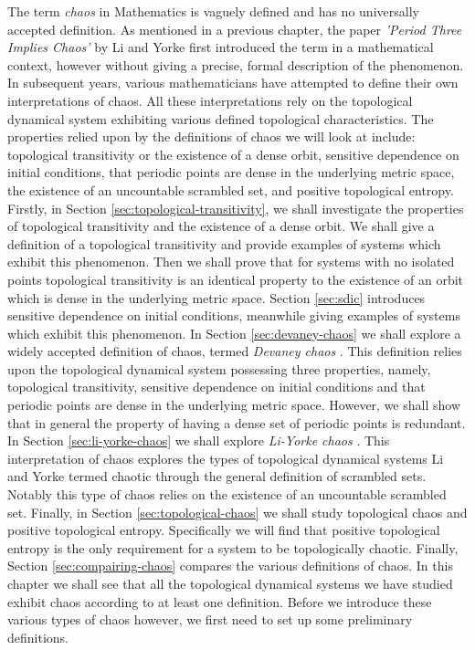 The term \emph{chaos} in Mathematics is vaguely defined and has no universally accepted definition. As mentioned in a previous chapter, the paper \emph{'Period Three Implies Chaos'} by Li and Yorke \cite{li-yorke} first introduced the term in a mathematical context, however without giving a precise, formal description of the phenomenon. In subsequent years, various mathematicians have attempted to define their own interpretations of chaos. All these interpretations rely on the topological dynamical system exhibiting various defined topological characteristics. The properties relied upon by the definitions of chaos we will look at include: topological transitivity or the existence of a dense orbit, sensitive dependence on initial conditions, that periodic points are dense in the underlying metric space, the existence of an uncountable scrambled set, and positive topological entropy. Firstly, in Section \ref{sec:topological-transitivity}, we shall investigate the properties of topological transitivity and the existence of a dense orbit. We shall give a definition of a topological transitivity and provide examples of systems which exhibit this phenomenon. Then we shall prove that for systems with no isolated points topological transitivity is an identical property to the existence of an orbit which is dense in the underlying metric space. Section \ref{sec:sdic} introduces sensitive dependence on initial conditions, meanwhile giving examples of systems which exhibit this phenomenon. In Section \ref{sec:devaney-chaos} we shall explore a widely accepted definition of chaos, termed \emph{Devaney chaos} \cite{devaney}. This definition relies upon the topological dynamical system possessing three properties, namely, topological transitivity, sensitive dependence on initial conditions and that periodic points are dense in the underlying metric space. However, we shall show that in general the property of having a dense set of periodic points is redundant. In Section \ref{sec:li-yorke-chaos} we shall explore \emph{Li-Yorke chaos} \cite{li-yorke}. This interpretation of chaos explores the types of topological dynamical systems Li and Yorke termed chaotic through the general definition of scrambled sets. Notably this type of chaos relies on the existence of an uncountable scrambled set. Finally, in Section \ref{sec:topological-chaos} we shall study topological chaos and positive topological entropy. Specifically we will find that positive topological entropy is the only requirement for a system to be topologically chaotic. Finally, Section \ref{sec:compairing-chaos} compares the various definitions of chaos. In this chapter we shall see that all the topological dynamical systems we have studied exhibit chaos according to at least one definition. Before we introduce these various types of chaos however, we first need to set up some preliminary definitions.


